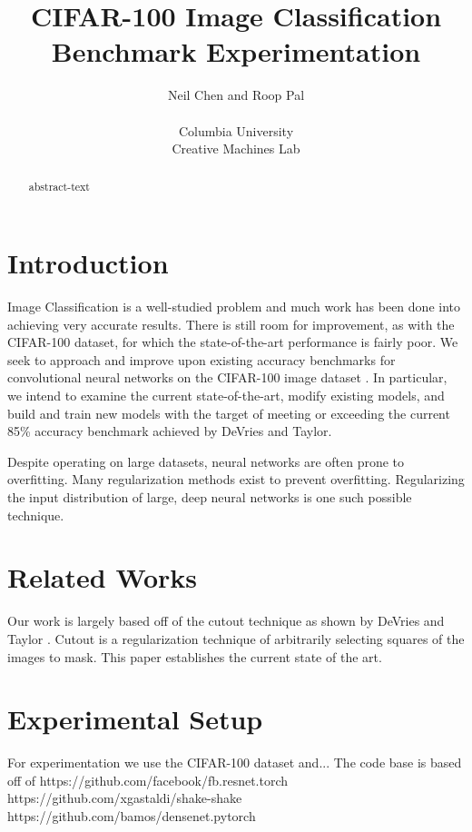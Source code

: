 \documentclass{article}
\begin{document}
\title{CIFAR-100 Image Classification Benchmark Experimentation}
\author{Neil Chen and Roop Pal \\ \\ Columbia University \\ Creative Machines Lab}
\date{}
\maketitle

\begin{multicols*}{2}
\begin{abstract}
   abstract-text
\end{abstract}

\section{Introduction}
	Image Classification is a well-studied problem and much work has been done into achieving very accurate results. There is still room for improvement, as with the CIFAR-100 dataset, for which the state-of-the-art performance is fairly poor. We seek to approach and improve upon existing accuracy benchmarks for convolutional neural networks on the CIFAR-100 image dataset \cite{Krizhevsky}. In particular, we intend to examine the current state-of-the-art, modify existing models, and build and train new models with the target of meeting or exceeding the current 85\% \cite{DeVries} accuracy benchmark achieved by DeVries and Taylor.    
    
	Despite operating on large datasets, neural networks are often prone to overfitting. Many regularization methods exist to prevent overfitting. Regularizing the input distribution of large, deep neural networks is one such possible technique.

\section{Related Works}
	Our work is largely based off of the cutout technique as shown by DeVries and Taylor \cite{DeVries}. Cutout is a regularization technique of arbitrarily selecting squares of the images to mask. This paper establishes the current state of the art. 
    
\section{Experimental Setup}
	For experimentation we use the CIFAR-100 dataset and... 
    The code base is based off of https://github.com/facebook/fb.resnet.torch
    https://github.com/xgastaldi/shake-shake
    https://github.com/bamos/densenet.pytorch


\end{multicols*}
\end{document}
